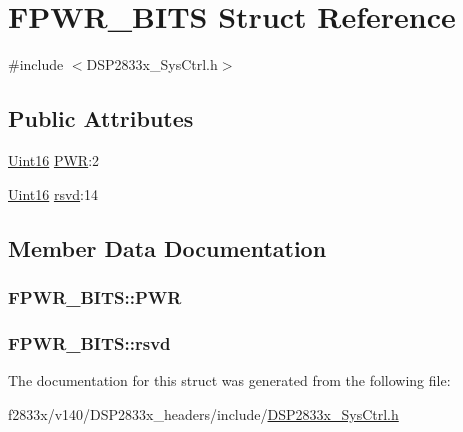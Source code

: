\hypertarget{struct_f_p_w_r___b_i_t_s}{}\section{F\+P\+W\+R\+\_\+\+B\+I\+T\+S Struct Reference}
\label{struct_f_p_w_r___b_i_t_s}


{\ttfamily \#include $<$D\+S\+P2833x\+\_\+\+Sys\+Ctrl.\+h$>$}

\subsection*{Public Attributes}
\begin{DoxyCompactItemize}
\item 
\hyperlink{_d_s_p2833x___device_8h_a59a9f6be4562c327cbfb4f7e8e18f08b}{Uint16} \hyperlink{struct_f_p_w_r___b_i_t_s_a4d54370d9d141da652a5c729adb8252f}{P\+W\+R}\+:2
\item 
\hyperlink{_d_s_p2833x___device_8h_a59a9f6be4562c327cbfb4f7e8e18f08b}{Uint16} \hyperlink{struct_f_p_w_r___b_i_t_s_a57f27439cf48049a7582c1c1f8298cdc}{rsvd}\+:14
\end{DoxyCompactItemize}


\subsection{Member Data Documentation}
\hypertarget{struct_f_p_w_r___b_i_t_s_a4d54370d9d141da652a5c729adb8252f}{}
\subsubsection[{P\+W\+R}]{ F\+P\+W\+R\+\_\+\+B\+I\+T\+S\+::\+P\+W\+R}\label{struct_f_p_w_r___b_i_t_s_a4d54370d9d141da652a5c729adb8252f}
\hypertarget{struct_f_p_w_r___b_i_t_s_a57f27439cf48049a7582c1c1f8298cdc}{}
\subsubsection[{rsvd}]{ F\+P\+W\+R\+\_\+\+B\+I\+T\+S\+::rsvd}\label{struct_f_p_w_r___b_i_t_s_a57f27439cf48049a7582c1c1f8298cdc}


The documentation for this struct was generated from the following file\+:\begin{DoxyCompactItemize}
\item 
f2833x/v140/\+D\+S\+P2833x\+\_\+headers/include/\hyperlink{_d_s_p2833x___sys_ctrl_8h}{D\+S\+P2833x\+\_\+\+Sys\+Ctrl.\+h}\end{DoxyCompactItemize}
